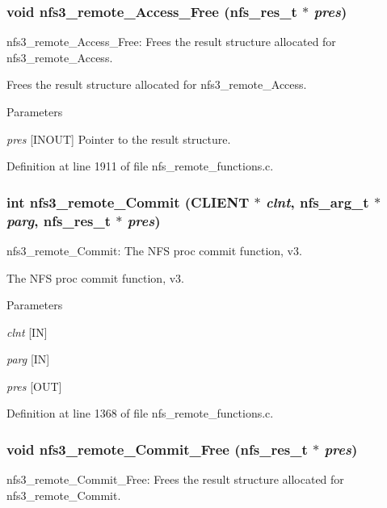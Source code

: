 \subsubsection[{nfs3\_\-remote\_\-Access\_\-Free}]{\setlength{\rightskip}{0pt plus 5cm}void nfs3\_\-remote\_\-Access\_\-Free (nfs\_\-res\_\-t $\ast$ {\em pres})}\label{group__NFSprocs_gad07a84ff71227f3f26103c78a39b1225}
nfs3\_\-remote\_\-Access\_\-Free: Frees the result structure allocated for nfs3\_\-remote\_\-Access.

Frees the result structure allocated for nfs3\_\-remote\_\-Access.


\begin{DoxyParams}{Parameters}
\item[{\em pres}][INOUT] Pointer to the result structure. \end{DoxyParams}


Definition at line 1911 of file nfs\_\-remote\_\-functions.c.
\subsubsection[{nfs3\_\-remote\_\-Commit}]{\setlength{\rightskip}{0pt plus 5cm}int nfs3\_\-remote\_\-Commit (CLIENT $\ast$ {\em clnt}, \/  nfs\_\-arg\_\-t $\ast$ {\em parg}, \/  nfs\_\-res\_\-t $\ast$ {\em pres})}\label{group__NFSprocs_ga5f699a93eee20fe5ed6ffaca441dc825}
nfs3\_\-remote\_\-Commit: The NFS proc commit function, v3.

The NFS proc commit function, v3.


\begin{DoxyParams}{Parameters}
\item[{\em clnt}][IN] \item[{\em parg}][IN] \item[{\em pres}][OUT] \end{DoxyParams}


Definition at line 1368 of file nfs\_\-remote\_\-functions.c.
\subsubsection[{nfs3\_\-remote\_\-Commit\_\-Free}]{\setlength{\rightskip}{0pt plus 5cm}void nfs3\_\-remote\_\-Commit\_\-Free (nfs\_\-res\_\-t $\ast$ {\em pres})}\label{group__NFSprocs_gaa842a203c0d62f114849e70e96318e0c}
nfs3\_\-remote\_\-Commit\_\-Free: Frees the result structure allocated for nfs3\_\-remote\_\-Commit.

